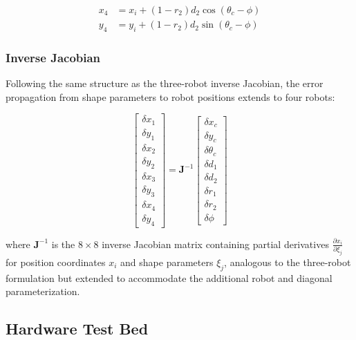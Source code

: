 \documentclass[lettersize,journal]{IEEEtran}
\begin{document}
\begin{equation}
\begin{aligned}
x_4 &= x_i + (1 - r_2) d_2 \cos(\theta_c - \phi) \\
y_4 &= y_i + (1 - r_2) d_2 \sin(\theta_c - \phi)
\end{aligned}
\end{equation}

\subsubsection{Inverse Jacobian}

Following the same structure as the three-robot inverse Jacobian, the error propagation from shape parameters to robot positions extends to four robots:

\begin{equation}
\begin{bmatrix}
\delta x_1 \\ \delta y_1 \\ \delta x_2 \\ \delta y_2 \\ \delta x_3 \\ \delta y_3 \\ \delta x_4 \\ \delta y_4
\end{bmatrix} =
\mathbf{J}^{-1}
\begin{bmatrix}
\delta x_c \\ \delta y_c \\ \delta \theta_c \\ \delta d_1 \\ \delta d_2 \\ \delta r_1 \\ \delta r_2 \\ \delta \phi
\end{bmatrix}
\end{equation}

where $\mathbf{J}^{-1}$ is the $8 \times 8$ inverse Jacobian matrix containing partial derivatives $\frac{\partial x_i}{\partial \xi_j}$ for position coordinates $x_i$ and shape parameters $\xi_j$, analogous to the three-robot formulation but extended to accommodate the additional robot and diagonal parameterization.


\subsection{Hardware Test Bed}
\end{document}
